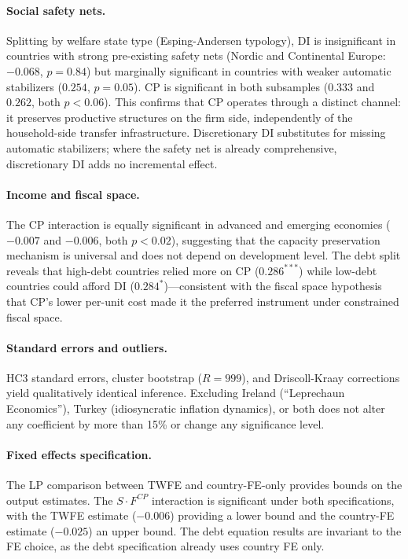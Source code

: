 \paragraph{Social safety nets.} Splitting by welfare state type (Esping-Andersen typology), DI is insignificant in countries with strong pre-existing safety nets (Nordic and Continental Europe: $-0.068$, $p = 0.84$) but marginally significant in countries with weaker automatic stabilizers ($0.254$, $p = 0.05$). CP is significant in both subsamples ($0.333$ and $0.262$, both $p < 0.06$). This confirms that CP operates through a distinct channel: it preserves productive structures on the firm side, independently of the household-side transfer infrastructure. Discretionary DI substitutes for missing automatic stabilizers; where the safety net is already comprehensive, discretionary DI adds no incremental effect.

\paragraph{Income and fiscal space.} The CP interaction is equally significant in advanced and emerging economies ($-0.007$ and $-0.006$, both $p < 0.02$), suggesting that the capacity preservation mechanism is universal and does not depend on development level. The debt split reveals that high-debt countries relied more on CP ($0.286^{***}$) while low-debt countries could afford DI ($0.284^{*}$)---consistent with the fiscal space hypothesis that CP's lower per-unit cost made it the preferred instrument under constrained fiscal space.

\paragraph{Standard errors and outliers.} HC3 standard errors, cluster bootstrap ($R = 999$), and Driscoll-Kraay corrections yield qualitatively identical inference. Excluding Ireland (``Leprechaun Economics''), Turkey (idiosyncratic inflation dynamics), or both does not alter any coefficient by more than 15\% or change any significance level.

\paragraph{Fixed effects specification.} The LP comparison between TWFE and country-FE-only provides bounds on the output estimates. The $S \cdot F^{CP}$ interaction is significant under both specifications, with the TWFE estimate ($-0.006$) providing a lower bound and the country-FE estimate ($-0.025$) an upper bound. The debt equation results are invariant to the FE choice, as the debt specification already uses country FE only.


